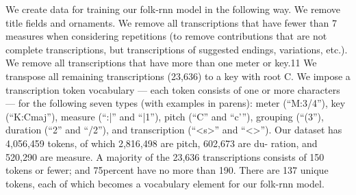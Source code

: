 We create data for training our folk-rnn model in the following way. We
remove title fields and ornaments. We remove all transcriptions that have fewer than 7 measures when considering repetitions (to remove contributions that are not complete transcriptions, but transcriptions of suggested endings, variations, etc.). We remove all transcriptions that have more than one meter or key.11 We transpose all remaining transcriptions (23,636) to a key with root C.
We impose a transcription token vocabulary — each token consists of one or more characters — for the following seven types (with examples in parens): meter (“M:3/4”), key (“K:Cmaj”), measure (“:|” and “|1”), pitch (“C” and “c’”),
grouping (“(3”), duration (“2” and “/2”), and transcription (“<s>” and “<\s>”). 
Our dataset has 4,056,459 tokens, of which 2,816,498 are pitch, 602,673 are du- ration, and 520,290 are measure. A majority of the 23,636 transcriptions consists of 150 tokens or fewer; and 75percent have no more than 190. There are 137 unique tokens, each of which becomes a vocabulary element for our folk-rnn model.

